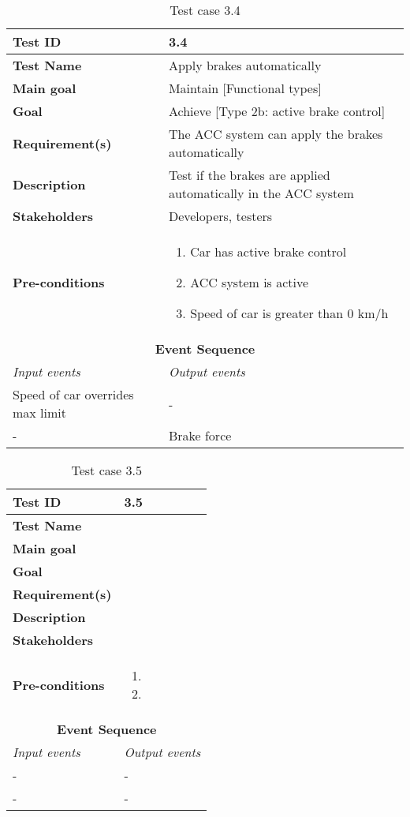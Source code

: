 \begin{table}[H]
\centering
\begin{tabularx}{\linewidth}{X|X}
  \hline
  \textbf{Test ID} & 3.4\\
  \hline
  \textbf{Test Name} &  Apply brakes automatically\\
  \hline
  \textbf{Main goal} &  Maintain [Functional types]\\
  \hline
  \textbf{Goal} & Achieve [Type 2b: active brake control] \\
  \hline
  \textbf{Requirement(s)} &  The ACC system can apply the brakes automatically\\
  \hline
  \textbf{Description} &  Test if the brakes are applied automatically in the ACC system\\
  \hline
  \textbf{Stakeholders} &  Developers, testers\\
  \hline
  \textbf{Pre-conditions} &  
  \begin{enumerate}
      \item Car has active brake control
      \item ACC system is active
      \item Speed of car is greater than 0 km/h
  \end{enumerate}\\
  \hline
  \multicolumn{2}{c}{\textbf{Event Sequence}} \\
  \hline
  \textit{Input events} & \textit{Output events} \\
  \hline
   Speed of car overrides max limit & - \\
  \hline
   - & Brake force \\
  \hline
  \end{tabularx}
\caption{\label{tab_caseX} Test case 3.4}
\end{table}


\begin{table}[H]
\centering
\begin{tabularx}{\linewidth}{X|X}
  \hline
  \textbf{Test ID} & 3.5\\
  \hline
  \textbf{Test Name} &  \\
  \hline
  \textbf{Main goal} &  \\
  \hline
  \textbf{Goal} &  \\
  \hline
  \textbf{Requirement(s)} &  \\
  \hline
  \textbf{Description} &  \\
  \hline
  \textbf{Stakeholders} &  \\
  \hline
  \textbf{Pre-conditions} & 
  \begin{enumerate}
      \item
      \item
  \end{enumerate} \\
  \hline
  \multicolumn{2}{c}{\textbf{Event Sequence}} \\
  \hline
  \textit{Input events} & \textit{Output events} \\
  \hline
   - & - \\
  \hline
   - & - \\
  \hline
  \end{tabularx}
\caption{\label{tab_caseX} Test case 3.5}
\end{table}